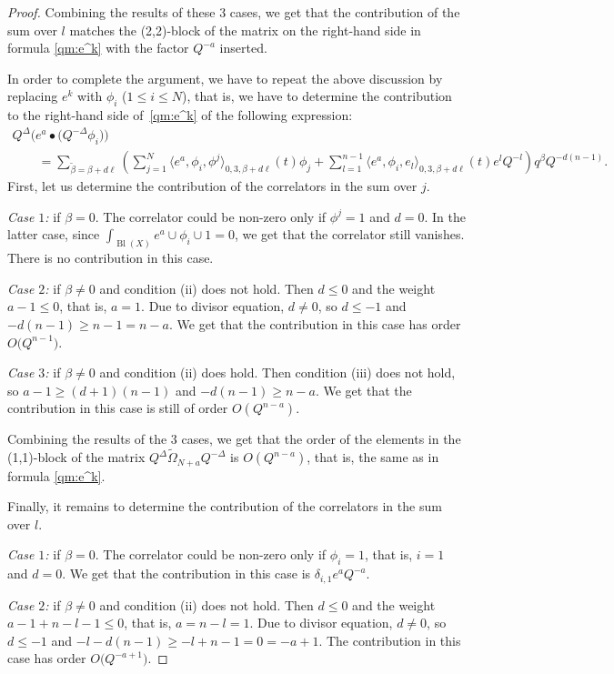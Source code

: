 \documentclass[10pt,a4paper]{article}
\numberwithin{equation}{section}
\begin{document}
\begin{proof}
Combining the results of these 3 cases, we get that the contribution
of the sum over $l$ matches the (2,2)-block of the matrix on the right-hand side
in formula \eqref{qm:e^k} with the factor $Q^{-a}$ inserted.

In order to complete the argument, we have to repeat the
above discussion by replacing $e^k$ with $\phi_i$ ($1\leq i\leq
N$), that is, we have to determine the contribution to the right-hand side of~\eqref{qm:e^k} of the following expression:
\begin{gather*}
Q^\Delta \big(e^a\bullet \big(Q^{-\Delta} \phi_i\big) \big)\\
\qquad=
\sum_{\widetilde{\beta}=\beta+d\ell}
\left(
\sum_{j=1}^N
\big\langle e^a, \phi_i, \phi^j\big\rangle_{0,3,\beta+ d\ell}(t)
\phi_j +
\sum_{l=1}^{n-1} \big\langle e^a, \phi_i, e_l\big\rangle_{0,3,\beta+d\ell} (t)
e^l Q^{-l}
\right) q^\beta Q^{-d(n-1)}.
\end{gather*}
First, let us determine the contribution of the correlators in the sum
over $j$.

{\em Case $1$:} if $\beta=0$. The correlator could be non-zero only if
$\phi^j=1$ and $d=0$. In the latter case, since $\int_{\operatorname{Bl}(X)}
e^a\cup \phi_i\cup 1 =0$, we get that the correlator still
vanishes. There is no contribution in this case.

{\em Case $2$:} if $\beta\neq 0$ and condition (ii) does not hold. Then
$d\leq 0$ and the weight $a-1\leq 0$, that is, $a=1$. Due to divisor
equation, $d\neq 0$, so $d\leq -1$ and $-d(n-1)\geq n-1=n-a$. We
get that the contribution in this case has order $O\big(Q^{n-1}\big)$.

{\em Case $3$:} if $\beta\neq 0$ and condition (ii) does hold. Then
condition (iii) does not hold, so
${a-1\geq (d+1)(n-1)}$ and $-d(n-1)\geq n-a$. We get that the
contribution in this case is still of order $O(Q^{n-a})$.

Combining the results of the 3 cases, we get that the order of the
elements in the (1,1)-block of the matrix
$Q^\Delta \widetilde{\Omega}_{N+a} Q^{-\Delta}$ is $O(Q^{n-a})$, that
is, the same as in formula \eqref{qm:e^k}.

Finally, it remains to determine the contribution of the correlators
in the sum over $l$.

{\em Case $1$:} if $\beta=0$. The correlator could be non-zero only if
$\phi_i=1$, that is, $i=1$ and $d=0$. We get that the contribution in
this case is $\delta_{i,1} e^a Q^{-a}$.

{\em Case $2$:} if $\beta\neq 0$ and condition (ii) does not hold. Then
$d\leq 0$ and the weight $a-1+n-l-1\leq 0$, that is, $a=n-l=1$. Due to divisor
equation, $d\neq 0$, so $d\leq -1$ and $-l-d(n-1)\geq
-l+n-1=0=-a+1$. The contribution in this case has order $O\big(Q^{-a+1}\big)$.


\end{proof}
\end{document}
